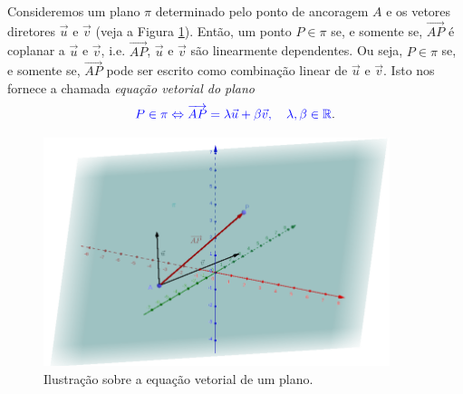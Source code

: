 Consideremos um plano $\pi$ determinado pelo ponto de ancoragem $A$ e os vetores diretores $\vec{u}$ e $\vec{v}$ (veja a Figura \ref{fig:ep_evp}). Então, um ponto $P\in \pi$ se, e somente se, $\overrightarrow{AP}$ é coplanar a $\vec{u}$ e $\vec{v}$, i.e. $\overrightarrow{AP}$, $\vec{u}$ e $\vec{v}$ são linearmente dependentes. Ou seja, $P\in\pi$ se, e somente se, $\overrightarrow{AP}$ pode ser escrito como combinação linear de $\vec{u}$ e $\vec{v}$. Isto nos fornece a chamada \emph{equação vetorial do plano}
\begin{equation}
  {\color{blue}P\in\pi \Leftrightarrow \overrightarrow{AP} = \lambda\vec{u}+\beta\vec{v},\quad\lambda,\beta\in\mathbb{R}}.
\end{equation}

\begin{figure}[H]
  \centering
  \includegraphics[width=0.9\textwidth]{cap_estudo/dados/fig_ep_evp/fig}
  \caption{Ilustração sobre a equação vetorial de um plano.}
  \label{fig:ep_evp}
\end{figure}


